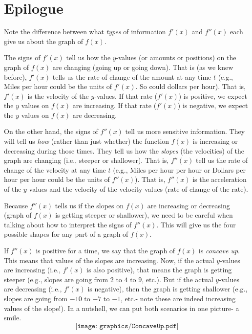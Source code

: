 \documentclass{ximera}
\begin{document}
\section*{Epilogue}

Note the difference between what {\em types} of information $f'(x)$ and $f''(x)$ each give us about the graph of $f(x)$.  

The signs of $f'(x)$ tell us how the $y$-values (or amounts or positions) on the graph of $f(x)$ are changing (going up or going down).  That is (as we knew before), $f'(x)$ tells us the rate of change of the amount at any time $t$ (e.g., Miles per hour could be the units of $f'(x)$.  So could dollars per hour).  That is, $f'(x)$ is the velocity of the $y$-values.  If that rate ($f'(x)$) is positive, we expect the $y$ values on $f(x)$ are increasing.  If that rate ($f'(x)$) is negative, we expect the $y$ values on $f(x)$ are decreasing.

On the other hand, the signs of $f''(x)$ tell us more sensitive information.  They will tell us {\em how} (rather than just whether) the function $f(x)$ is increasing or decreasing during those times.  They tell us how the {\em slopes} (the velocities) of the graph are changing (i.e., steeper or shallower).  That is, $f''(x)$ tell us the rate of change of the velocity at any time $t$ (e.g., Miles per hour per hour or Dollars per hour per hour could be the units of $f''(x)$).  That is, $f''(x)$ is the acceleration of the $y$-values and the velocity of the velocity values (rate of change of the rate).

Because $f''(x)$ tells us if the slopes on $f(x)$ are increasing or decreasing (graph of $f(x)$ is getting steeper or shallower), we need to be careful when talking about how to interpret the signs of $f''(x)$.  This will give us the four possible shapes for any part of a graph of $f(x)$.

If $f''(x)$ is positive for a time, we say that the graph of $f(x)$ is {\em concave up}.  This means that values of the slopes are increasing.  Now, if the actual $y$-values are increasing (i.e., $f'(x)$ is also positive), that means the graph is getting steeper (e.g., slopes are going from $2$ to $4$ to $9$, etc.).  But if the actual $y$-values are decreasing (i.e., $f'(x)$ is negative), then the graph is getting shallower (e.g., slopes are going from $-10$ to $-7$ to $-1$, etc.- note these are indeed increasing values of the slope!). In a nutshell, we can put both scenarios in one picture- a smile.
\[
\texttt{[image: graphics/ConcaveUp.pdf]}
\]
\end{document}
